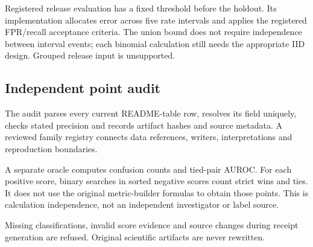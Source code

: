 Registered release evaluation has a fixed threshold before the holdout.
Its implementation allocates error across five rate intervals and applies the
registered FPR/recall acceptance criteria. The union bound does not require
independence between interval events; each binomial calculation still needs the
appropriate IID design. Grouped release input is unsupported.

\subsection{Independent point audit}
The audit parses every current README-table row, resolves its field uniquely,
checks stated precision and records artifact hashes and source metadata.
A reviewed family registry connects data references, writers, interpretations
and reproduction boundaries.

A separate oracle computes confusion counts and tied-pair AUROC. For each
positive score, binary searches in sorted negative scores count strict wins and
ties. It does not use the original metric-builder formulas to obtain those
points. This is calculation independence, not an independent investigator or
label source.

Missing classifications, invalid score evidence and source changes during
receipt generation are refused. Original scientific artifacts are never
rewritten.
